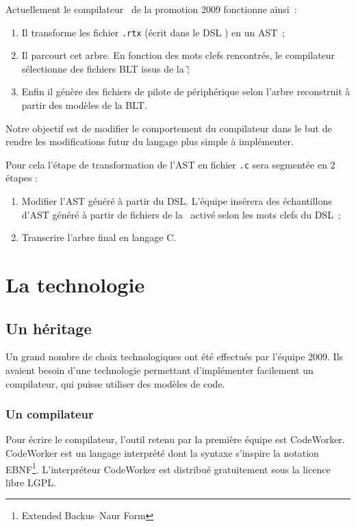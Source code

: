 \documentclass{rtxreport}
\begin{document}
Actuellement le compilateur \rtx\ de la promotion 2009 fonctionne ainsi~:
\begin{enumerate}
\item Il transforme les fichier \texttt{.rtx} (écrit dans le DSL \rtx) en un AST~;
\item Il parcourt cet arbre. En fonction des mots clefs rencontrés, le
compilateur sélectionne des fichiers BLT issus de la \BL\~;
\item Enfin il génère des fichiers de pilote de périphérique selon l'arbre
reconstruit à partir des modèles de la BLT.
\end{enumerate}

Notre objectif est de modifier le comportement du compilateur dans le but de
rendre les modifications futur du langage plus simple à implémenter.

Pour cela l'étape de transformation de l'AST en fichier \texttt{.c} sera
segmentée en 2 étapes :
\begin{enumerate}
\item Modifier l'AST généré à partir du DSL. L'équipe insérera des échantillons
d'AST généré à partir de fichiers de la \BL\ activé selon les mots clefs du
DSL~;
\item Transcrire l'arbre final en langage C.
\end{enumerate}

\chapter{La technologie \rtx}

\section{Un héritage}

Un grand nombre de choix technologiques ont été effectués par l'équipe 2009.
Ils avaient besoin d'une technologie permettant d'implémenter facilement un
compilateur, qui puisse utiliser des modèles de code.

\subsection{Un compilateur}

Pour écrire le compilateur, l'outil retenu par la première équipe est
CodeWorker. CodeWorker est un langage interprété dont la syntaxe s'inspire la
notation EBNF\footnote{Extended Backus--Naur Form}. L'interpréteur CodeWorker
est distribué gratuitement sous la licence libre LGPL\cite{LGPL21}.
\end{document}
